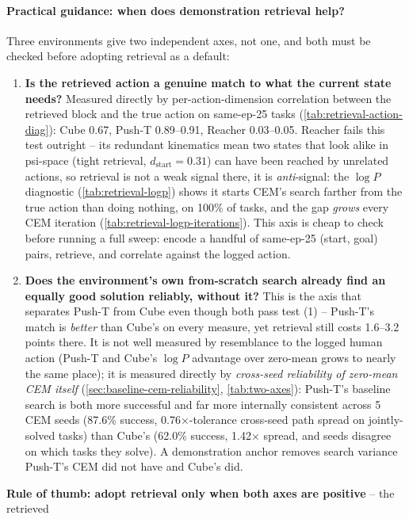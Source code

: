 \documentclass[11pt]{article}
\begin{document}
\paragraph{Practical guidance: when does demonstration retrieval help?} Three environments
give two independent axes, not one, and both must be checked before adopting retrieval as a
default:
\begin{enumerate}[nosep]
  \item \textbf{Is the retrieved action a genuine match to what the current state needs?}
  Measured directly by per-action-dimension correlation between the retrieved block and the
  true action on same-ep-25 tasks (\cref{tab:retrieval-action-diag}): Cube 0.67, Push-T
  0.89--0.91, Reacher 0.03--0.05. Reacher fails this test outright -- its redundant kinematics
  mean two states that look alike in psi-space (tight retrieval, $d_{\mathrm{start}}=0.31$)
  can have been reached by unrelated actions, so retrieval is not a weak signal there, it is
  \emph{anti}-signal: the $\log P$ diagnostic (\cref{tab:retrieval-logp}) shows it starts CEM's
  search farther from the true action than doing nothing, on 100\% of tasks, and the gap
  \emph{grows} every CEM iteration (\cref{tab:retrieval-logp-iterations}). This axis is cheap
  to check before running a full sweep: encode a handful of same-ep-25 (start, goal) pairs,
  retrieve, and correlate against the logged action.
  \item \textbf{Does the environment's own from-scratch search already find an equally good
  solution reliably, without it?} This is the axis that separates Push-T from Cube even
  though both pass test (1) -- Push-T's match is \emph{better} than Cube's on every measure,
  yet retrieval still costs 1.6--3.2 points there. It is not well measured by resemblance to
  the logged human action (Push-T and Cube's $\log P$ advantage over zero-mean grows to
  nearly the same place); it is measured directly by \emph{cross-seed reliability of
  zero-mean CEM itself} (\cref{sec:baseline-cem-reliability}, \cref{tab:two-axes}): Push-T's
  baseline search is both more successful and far more internally consistent across 5 CEM
  seeds (87.6\% success, 0.76$\times$-tolerance cross-seed path spread on jointly-solved
  tasks) than Cube's (62.0\% success, 1.42$\times$ spread, and seeds disagree on which tasks
  they solve). A demonstration anchor removes search variance Push-T's CEM did not have and
  Cube's did.
\end{enumerate}
\textbf{Rule of thumb: adopt retrieval only when both axes are positive} -- the retrieved
\end{document}
